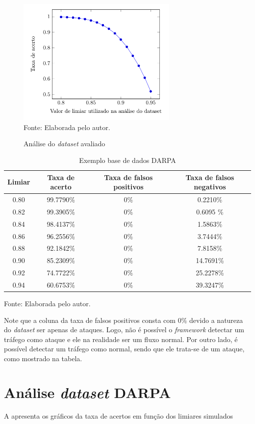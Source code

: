  \begin{figure}[htb]
 	\centering
 	\caption{Análise do \textit{dataset} avaliado }
 	\includegraphics[width=0.7\textwidth]{figs/results80-95Mining.pdf}\\
 	{Fonte: Elaborada pelo autor.}
 	\label{fig:ResultsMining}
 \end{figure}
 
 \begin{table}[htb]
 	\centering
 	\begin{threeparttable}
 		\caption{Exemplo base de dados DARPA}
 		\label{Tab:ResultsMining}
 		\begin{tabular}{c c c c}
 			\toprule
 			\textbf{Limiar} & \textbf{Taxa de acerto} & \textbf{Taxa de falsos positivos} & \textbf{Taxa de falsos negativos}
 			\\ \midrule
 			0.80 &  99.7790\% &  0\%& 0.2210\%   \\ \midrule
 			0.82 &  99.3905\% & 0\% & 0.6095 \%   \\ \midrule
 			0.84 &  98.4137\%  & 0\% & 1.5863\%   \\ \midrule
 			0.86 &  96.2556\%  &  0\% & 3.7444\%   \\ \midrule
 			0.88 &  92.1842\%  &  0\% & 7.8158\%     \\ \midrule
 			0.90 &  85.2309\%  & 0\% & 14.7691\%    \\ \midrule
 			0.92 &  74.7722\%  &  0\% & 25.2278\%   \\ \midrule
 			0.94 &  60.6753\%  & 0\% & 39.3247\%   \\ \bottomrule
 		\end{tabular}
 		{Fonte: Elaborada pelo autor.}
 	\end{threeparttable}
 \end{table}
 Note que a coluna da taxa de falsos positivos consta com $0\%$ devido a natureza do \textit{dataset} ser apenas de ataques. Logo, não é possível o \textit{framework} detectar um tráfego como ataque e ele na realidade ser um fluxo normal. Por outro lado, é possível detectar um tráfego como normal, sendo que ele trata-se de um ataque, como mostrado na tabela.
\section{Análise \textit{dataset} DARPA}
A  apresenta os gráficos da taxa de acertos em função dos limiares simulados 



   